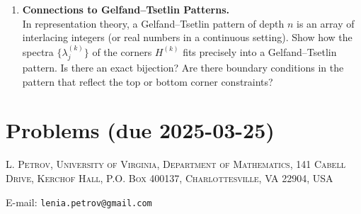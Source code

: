 \documentclass[letterpaper,11pt,oneside,reqno]{article}
\numberwithin{equation}{section}
\theoremstyle{definition}
\begin{document}
\begin{enumerate}[1.]
\item \textbf{Connections to Gelfand--Tsetlin Patterns.} \\
In representation theory, a Gelfand--Tsetlin pattern of depth \(n\) is an array of interlacing integers (or real numbers in a continuous setting). Show how the spectra \(\{\lambda_j^{(k)}\}\) of the corners \(H^{(k)}\) fits precisely into a Gelfand--Tsetlin pattern. Is there an exact bijection? Are there boundary conditions in the pattern that reflect the top or bottom corner constraints?

\end{enumerate}


































\appendix
\setcounter{section}{6}

\section{Problems (due 2025-03-25)}









\medskip

\textsc{L. Petrov, University of Virginia, Department of Mathematics, 141 Cabell Drive, Kerchof Hall, P.O. Box 400137, Charlottesville, VA 22904, USA}

E-mail: \texttt{lenia.petrov@gmail.com}
\end{document}
